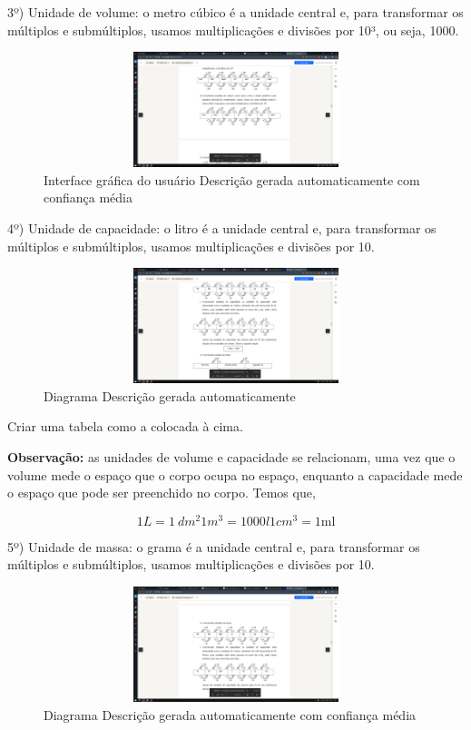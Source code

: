 3º) {Unidade de volume}: o metro cúbico é a unidade central e, para
transformar os múltiplos e submúltiplos, usamos multiplicações e
divisões por 10³, ou seja, 1000.

\begin{figure}
\centering
\includegraphics[width=4.79026in,height=1.32283in]{./imgSAEB_7_MAT/media/image79.png}
\caption{Interface gráfica do usuário Descrição gerada automaticamente
com confiança média}
\end{figure}


4º) {Unidade de capacidade:} o litro é a unidade central e, para
transformar os múltiplos e submúltiplos, usamos multiplicações e
divisões por 10.

\begin{figure}
\centering
\includegraphics[width=5.22733in,height=1.32283in]{./imgSAEB_7_MAT/media/image80.png}
\caption{Diagrama Descrição gerada automaticamente}
\end{figure}

Criar uma tabela como a colocada à cima.

\textbf{Observação:} as unidades de volume e capacidade se relacionam,
uma vez que o volume mede o espaço que o corpo ocupa no espaço, enquanto
a capacidade mede o espaço que pode ser preenchido no corpo. Temos que,

\[1L = 1\ dm^{2}1m^{3} = 1000l1cm^{3} = 1\text{ml}\]

5º) {Unidade de massa:} o grama é a unidade central e, para transformar
os múltiplos e submúltiplos, usamos multiplicações e divisões por 10.

\begin{figure}
\centering
\includegraphics[width=5.71654in,height=1.32283in]{./imgSAEB_7_MAT/media/image81.png}
\caption{Diagrama Descrição gerada automaticamente com confiança média}
\end{figure}

